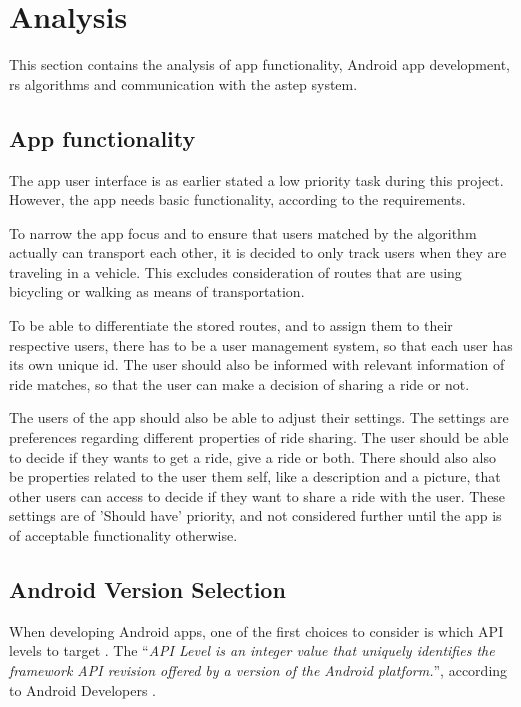 \section{Analysis}
This section contains the analysis of app functionality, Android app development, \gls{rs} algorithms and communication with the \gls{astep} system.

\subsection{App functionality}
The app user interface is as earlier stated a low priority task during this project.
However, the app needs basic functionality, according to the requirements.

To narrow the app focus and to ensure that users matched by the algorithm actually can transport each other, it is decided to only track users when they are traveling in a vehicle.
This excludes consideration of routes that are using bicycling or walking as means of transportation.

To be able to differentiate the stored routes, and to assign them to their respective users, there has to be a user management system, so that each user has its own unique id.
The user should also be informed with relevant information of ride matches, so that the user can make a decision of sharing a ride or not.

The users of the app should also be able to adjust their settings.
The settings are preferences regarding different properties of ride sharing.
The user should be able to decide if they wants to get a ride, give a ride or both.
There should also also be properties related to the user them self, like a description and a picture, that other users can access to decide if they want to share a ride with the user.
These settings are of 'Should have' priority, and not considered further until the app is of acceptable functionality otherwise.

\subsection{Android Version Selection}
When developing Android apps, one of the first choices to consider is which API levels to target \cite{usesSDK}.
The ``\textit{API Level is an integer value that uniquely identifies the framework API revision offered by a version of the Android platform.}'', according to Android Developers \cite{usesSDK}.

